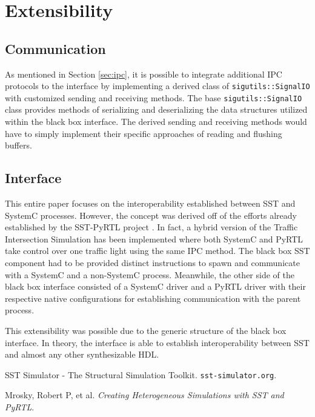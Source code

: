\documentclass{article}
\begin{document}
  \section{Extensibility}

    \subsection{Communication}
    As mentioned in Section \ref{sec:ipc}, it is possible to integrate additional IPC protocols to
    the interface by implementing a derived class of \texttt{sigutils::SignalIO} with customized
    sending and receiving methods. The base \texttt{sigutils::SignalIO} class provides methods of
    serializing and deserializing the data structures utilized within the black box interface. The
    derived sending and receiving methods would have to simply implement their specific approaches
    of reading and flushing buffers.

    \subsection{Interface}
    This entire paper focuses on the interoperability established between SST and SystemC processes.
    However, the concept was derived off of the efforts already established by the SST-PyRTL project
    \cite{pyrtl-sst}. In fact, a hybrid version of the Traffic Intersection Simulation has been
    implemented where both SystemC and PyRTL take control over one traffic light using the same IPC
    method. The black box SST component had to be provided distinct instructions to spawn and
    communicate with a SystemC and a non-SystemC process. Meanwhile, the other side of the black box
    interface consisted of a SystemC driver and a PyRTL driver with their respective native
    configurations for establishing communication with the parent process.

    This extensibility was possible due to the generic structure of the black box interface. In
    theory, the interface is able to establish interoperability between SST and almost any other
    synthesizable HDL.


  \begin{thebibliography}{5}

     SST Simulator - The Structural Simulation Toolkit. \texttt{sst-simulator.org}.

     Mrosky, Robert P, et al.
    \textit{Creating Heterogeneous Simulations with SST and PyRTL}.

  \end{thebibliography}
\end{document}
